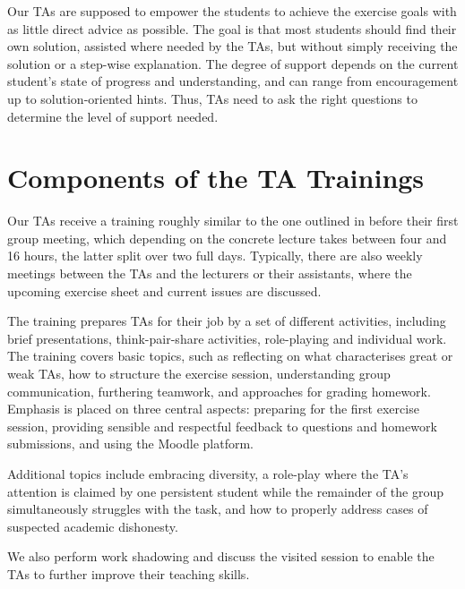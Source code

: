 \documentclass[sigconf,screen]{acmart}
\begin{document}
Our TAs are supposed to empower the students to achieve the exercise goals with as little
direct advice as possible. The goal is that most students should find their own solution,
assisted where needed by the TAs, but without simply receiving the solution or a 
step-wise explanation. The degree of support depends on the current student's
state of progress and understanding, and can range from encouragement
up to solution-oriented hints. Thus, TAs need to ask the right questions to determine the level
of support needed.

\section{Components of the TA Trainings}

Our TAs receive a training roughly similar to the one outlined in
\cite{Forbes:2017:SIC:3017680.3017694}
before their first group meeting,
which depending on the concrete lecture takes between four and 16 hours, the latter split over two full days.
Typically, there are also weekly meetings between the TAs and the lecturers or their assistants, where 
the upcoming exercise sheet and current issues are discussed.

The training prepares TAs for their job by a set of different activities, including 
brief presentations, think-pair-share activities, role-playing and individual work. The training covers
basic topics, such as reflecting on what characterises great or weak TAs, how to structure the exercise
session, understanding group communication, furthering teamwork, and approaches for grading homework.
Emphasis is placed on three central aspects: preparing for the first exercise session, providing sensible
and respectful feedback to questions and homework submissions, and using the Moodle platform.

Additional topics include embracing diversity, a role-play where the TA's attention is claimed by one
persistent student while the remainder of the group simultaneously struggles with the task, 
and how to properly address cases of suspected academic dishonesty.

We also perform work shadowing and discuss the visited session to enable the TAs to further improve 
their teaching skills.


\end{document}
